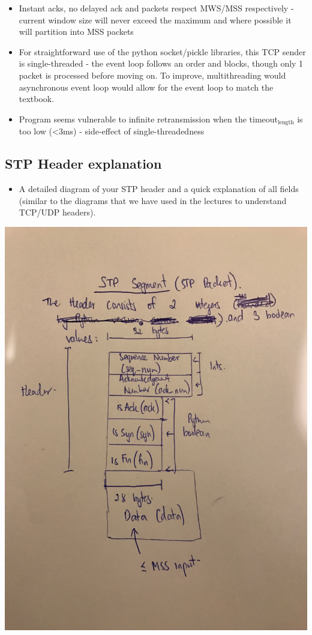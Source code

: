 \documentclass[11pt]{article}
\begin{document}
\begin{itemize}
\item Instant acks, no delayed ack and packets respect MWS/MSS respectively - current window size will never exceed the maximum and where possible it will partition into MSS packets
\item For straightforward use of the python socket/pickle libraries, this TCP sender is single-threaded - the event loop follows an order and blocks, though only 1 packet is processed before moving on. To improve, multithreading would  asynchronous event loop would allow for the event loop to match the textbook.
\item Program seems vulnerable to infinite retransmission when the timeout\(_{\text{length}}\) is too low (<3ms) - side-effect of single-threadedness
\end{itemize}
\subsection{STP Header explanation}
\label{sec:org1fd274c}
\begin{itemize}
\item A detailed diagram of your STP header and a quick explanation of all fields (similar to the diagrams that we have used in the lectures to understand TCP/UDP headers).
\end{itemize}
\begin{center}
\includegraphics[width=.9\linewidth]{./stp_header.JPG}
\end{center}
\end{document}
